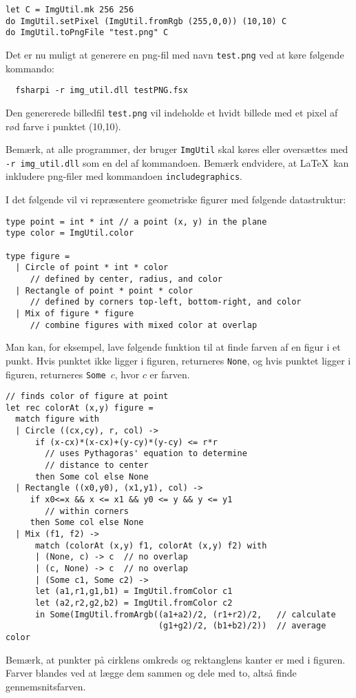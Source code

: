 \begin{lstlisting}[numbers=none,frame=none,mathescape]
let C = ImgUtil.mk 256 256
do ImgUtil.setPixel (ImgUtil.fromRgb (255,0,0)) (10,10) C
do ImgUtil.toPngFile "test.png" C
\end{lstlisting}

\noindent
Det er nu muligt at generere en png-fil med navn \texttt{test.png} ved
at køre følgende kommando:

\vspace{-4mm}
\begin{verbatim}
  fsharpi -r img_util.dll testPNG.fsx
\end{verbatim}
\vspace{-4mm}

\noindent
Den genererede billedfil \texttt{test.png} vil indeholde
et hvidt billede med et pixel af rød farve i punktet (10,10).

\noindent
Bemærk, at alle programmer, der bruger \texttt{ImgUtil} skal køres
eller oversættes med \texttt{-r img\_util.dll} som en del af
kommandoen.
%
Bemærk endvidere, at \LaTeX\ kan inkludere png-filer med
kommandoen \texttt{includegraphics}.

\vspace{2ex}

\noindent
I det følgende vil vi repræsentere geometriske figurer med følgende
datastruktur:

\begin{lstlisting}[numbers=none,frame=none,mathescape]
type point = int * int // a point (x, y) in the plane
type color = ImgUtil.color

type figure =
  | Circle of point * int * color
     // defined by center, radius, and color
  | Rectangle of point * point * color
     // defined by corners top-left, bottom-right, and color
  | Mix of figure * figure
     // combine figures with mixed color at overlap
\end{lstlisting}

\noindent
Man kan, for eksempel, lave følgende funktion til at finde farven af en
figur i et punkt.  Hvis punktet ikke ligger i figuren, returneres
\texttt{None}, og hvis punktet ligger i figuren, returneres
\texttt{Some $c$}, hvor $c$ er farven.

\begin{lstlisting}[numbers=none,frame=none,mathescape]
// finds color of figure at point
let rec colorAt (x,y) figure =
  match figure with
  | Circle ((cx,cy), r, col) ->
      if (x-cx)*(x-cx)+(y-cy)*(y-cy) <= r*r
        // uses Pythagoras' equation to determine
        // distance to center
      then Some col else None
  | Rectangle ((x0,y0), (x1,y1), col) ->
     if x0<=x && x <= x1 && y0 <= y && y <= y1
        // within corners
     then Some col else None
  | Mix (f1, f2) ->
      match (colorAt (x,y) f1, colorAt (x,y) f2) with
      | (None, c) -> c  // no overlap
      | (c, None) -> c  // no overlap
      | (Some c1, Some c2) ->
      let (a1,r1,g1,b1) = ImgUtil.fromColor c1
      let (a2,r2,g2,b2) = ImgUtil.fromColor c2
      in Some(ImgUtil.fromArgb((a1+a2)/2, (r1+r2)/2,   // calculate
                               (g1+g2)/2, (b1+b2)/2))  // average color
\end{lstlisting}

\noindent
Bemærk, at punkter på cirklens omkreds og rektanglens kanter er med i
figuren.  Farver blandes ved at lægge dem sammen og dele med to, altså
finde gennemsnitsfarven.
